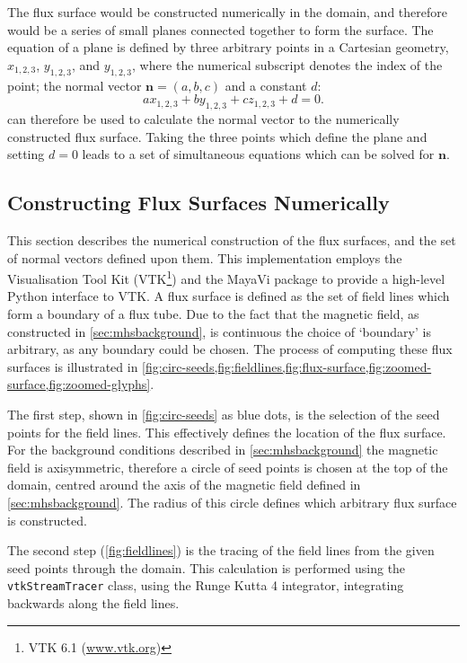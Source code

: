 \documentclass[a4paper,12pt,fourier,authoryear,custommargin]{Classes/PhDThesisPSnPDF}
\renewcommand{\vec}{\mathbf}
\providecommand{\DIFaddtex}[1]{{\protect\color{blue}\uwave{#1}}} %
\providecommand{\DIFaddbegin}{} %
\providecommand{\DIFaddend}{} %
\providecommand{\DIFadd}[1]{\texorpdfstring{\DIFaddtex{#1}}{#1}} %
\begin{document}
The flux surface would be constructed numerically in the domain, and therefore would be a series of small planes connected together to form the surface.
The equation of a plane is defined by three arbitrary points in a Cartesian geometry, $x_{1,2,3}$, $y_{1,2,3}$, and $y_{1,2,3}$, where the numerical subscript denotes the index of the point; the normal vector $\vec{n}=(a,b,c)$ and a constant $d$:
\begin{equation}
    ax_{1,2,3}+by_{1,2,3}+cz_{1,2,3}+d=0.
    \label{eq:plane}
\end{equation}
 can therefore be used to calculate the normal vector to the numerically constructed flux surface.
Taking the three points which define the plane and setting $d=0$ leads to a set of simultaneous equations which can be solved for $\vec{n}$.

\subsection{Constructing Flux Surfaces Numerically}

This section describes the numerical construction of the flux surfaces, and the set of normal vectors defined upon them.
This implementation employs the Visualisation Tool Kit (VTK\footnote{VTK 6.1 (\url{www.vtk.org})}) and the MayaVi package\DIFaddbegin \DIFadd{~}\DIFaddend \citep{ramachandran2011} to provide a high-level Python interface to VTK.
A flux surface is defined as the set of field lines which form a boundary of a flux tube.
Due to the fact that the magnetic field, as constructed in \cref{sec:mhsbackground}, is continuous the choice of `boundary' is arbitrary, as any boundary could be chosen.
The process of computing these flux surfaces is illustrated in \cref{fig:circ-seeds,fig:fieldlines,fig:flux-surface,fig:zoomed-surface,fig:zoomed-glyphs}.

The first step, shown in \cref{fig:circ-seeds} as blue dots, is the selection of the seed points for the field lines.
This effectively defines the location of the flux surface.
For the background conditions described in \cref{sec:mhsbackground} the magnetic field is axisymmetric, therefore a circle of seed points is chosen at the top of the domain, centred around the axis of the magnetic field defined in \cref{sec:mhsbackground}.
The radius of this circle defines which arbitrary flux surface is constructed.

The second step (\cref{fig:fieldlines}) is the tracing of the field lines from the given seed points through the domain.
This calculation is performed using the \verb|vtkStreamTracer| class, using the Runge Kutta 4 integrator, integrating backwards along the field lines.
\end{document}
